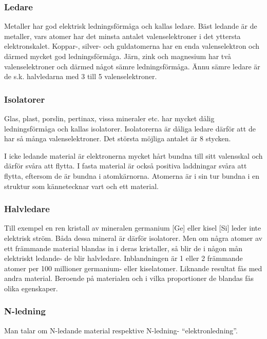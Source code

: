 \subsubsection{Ledare}

Metaller har god elektrisk ledningsförmåga och kallas ledare. Bäst ledande är
de metaller, vars atomer har det minsta antalet valenselektroner i det yttersta
elektronskalet. Koppar-, silver- och guldatomerna har en enda valenselektron
och därmed mycket god ledningsförmåga. Järn, zink och magnesium har två
valenselektroner och därmed något sämre ledningsförmåga. Ännu sämre ledare
är de s.k. halvledarna med 3 till 5 valenselektroner.

\subsubsection{Isolatorer}

Glas, plast, porslin, pertinax, vissa mineraler etc. har mycket dålig
ledningsförmåga och kallas isolatorer. Isolatorerna är dåliga ledare därför att
de har så många valenselektroner. Det största möjliga antalet är 8 stycken.

I icke ledande material är elektronerna mycket hårt bundna till sitt valensskal
och därför svåra att flytta. I fasta material är också positiva laddningar
svåra att flytta, eftersom de är bundna i atomkärnorna. Atomerna är i sin tur
bundna i en struktur som kännetecknar vart och ett material.

\subsubsection{Halvledare}

Till exempel en ren kristall av mineralen germanium [Ge] eller kisel [Si] leder
inte elektrisk ström. Båda dessa mineral är därför isolatorer. Men om några
atomer av ett främmande material blandas in i deras kristaller, så blir de i
någon mån elektriskt ledande- de blir halvledare. Inblandningen är 1 eller 2
främmande atomer per 100 millioner germanium- eller kiselatomer. Liknande
resultat fås med andra material. Beroende på materialen och i vilka
proportioner de blandas fås olika egenskaper.

\subsubsection{N-ledning}
Man talar om N-ledande material respektive N-ledning- ``elektronledning''.

